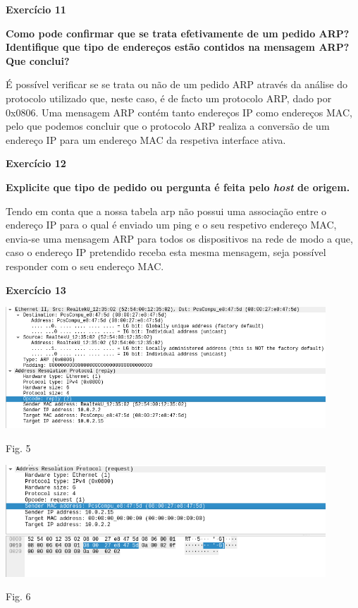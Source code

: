 \documentclass{article}
\begin{document}
\vspace{0.5cm}
\textbf{Exercício 11}\vspace{0.5cm}

\textbf{Como pode confirmar que se trata efetivamente de um pedido ARP? Identifique que tipo de endereços estão contidos na mensagem ARP? Que conclui?}\vspace{0.35cm}

\hspace{0.5cm}É possível verificar se se trata ou não de um pedido ARP através da análise do protocolo utilizado que, neste caso, é de facto um protocolo ARP, dado por 0x0806. Uma mensagem ARP contém tanto endereços IP como endereços MAC, pelo que podemos concluir que o protocolo ARP realiza a conversão de um endereço IP para um endereço MAC da respetiva interface ativa.

\vspace{0.5cm}
\textbf{Exercício 12}\vspace{0.5cm}

\textbf{Explicite que tipo de pedido ou pergunta é feita pelo \textit{host} de origem.}\vspace{0.35cm}

\hspace{0.5cm}Tendo em conta que a nossa tabela arp não possui uma associação entre o endereço IP para o qual é enviado um ping e o seu respetivo endereço MAC, envia-se uma mensagem ARP para todos os dispositivos na rede de modo a que, caso o endereço IP pretendido receba esta mesma mensagem, seja possível responder com o seu endereço MAC.


\vspace{0.5cm}
\textbf{Exercício 13}\vspace{0.5cm}

\begin{center}
\includegraphics[width = 12cm]{5.png}

\caption{Fig. 5}
\end{center}

\vspace{0.5cm}
\begin{center}
\includegraphics[width = 12cm]{6.png}

\caption{Fig. 6}
\end{center}
\end{document}
